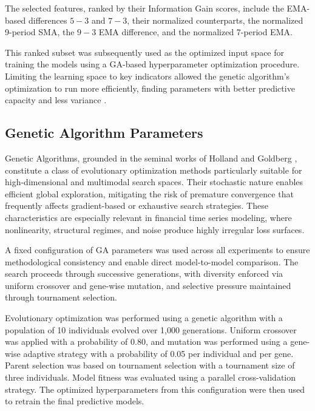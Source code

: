 \documentclass[conference]{IEEEtran}
\begin{document}
The selected features, ranked by their Information Gain scores, include the EMA-based differences $5\!-\!3$ and $7\!-\!3$, their normalized counterparts, the normalized 9-period SMA, the $9\!-\!3$ EMA difference, and the normalized 7-period EMA. 

This ranked subset was subsequently used as the optimized input space for training the models using a GA-based hyperparameter optimization procedure. Limiting the learning space to key indicators allowed the genetic algorithm's optimization to run more efficiently, finding parameters with better predictive capacity and less variance \cite{kumar2014feature}.

\subsection{Genetic Algorithm Parameters}
\label{sec:Genetic Algorithm Parameters}

Genetic Algorithms, grounded in the seminal works of Holland \cite{holland1984genetic} and Goldberg \cite{goldberg1989genetic}, constitute a class of evolutionary optimization methods particularly suitable for high-dimensional and multimodal search spaces. Their stochastic nature enables efficient global exploration, mitigating the risk of premature convergence that frequently affects gradient-based or exhaustive search strategies. These characteristics are especially relevant in financial time series modeling, where nonlinearity, structural regimes, and noise produce highly irregular loss surfaces.

A fixed configuration of GA parameters was used across all experiments to ensure methodological consistency and enable direct model-to-model comparison. The search proceeds through successive generations, with diversity enforced via uniform crossover and gene-wise mutation, and selective pressure maintained through tournament selection.

Evolutionary optimization was performed using a genetic algorithm with a population of 10 individuals evolved over 1,000 generations. Uniform crossover was applied with a probability of 0.80, and mutation was performed using a gene-wise adaptive strategy with a probability of 0.05 per individual and per gene. Parent selection was based on tournament selection with a tournament size of three individuals. Model fitness was evaluated using a parallel cross-validation strategy. The optimized hyperparameters from this configuration were then used to retrain the final predictive models.
\end{document}
